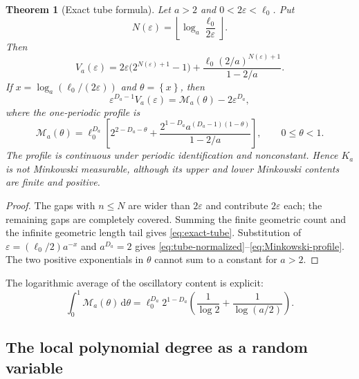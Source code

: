 \documentclass[11pt,oneside]{article}
\newtheorem{theorem}{Theorem}[section]
\theoremstyle{definition}
\theoremstyle{remark}
\newcommand{\dd}{\,\mathrm d}
\newcommand{\eps}{\varepsilon}
\newcommand{\floor}[1]{\left\lfloor #1\right\rfloor}
\newcommand{\fract}[1]{\left\{#1\right\}}
\begin{document}
\begin{theorem}[Exact tube formula]
\label{thm:tube-formula}
Let $a>2$ and $0<2\eps<\ell_0$.  Put
\begin{equation}
 N(\eps)=\floor{\log_a\frac{\ell_0}{2\eps}}.
 \label{eq:N-eps}
\end{equation}
Then
\begin{equation}
 \boxed{\quad
 V_a(\eps)=2\eps\bigl(2^{N(\eps)+1}-1\bigr)
 +\frac{\ell_0(2/a)^{N(\eps)+1}}{1-2/a}.
 \quad}
 \label{eq:exact-tube}
\end{equation}
If $x=\log_a(\ell_0/(2\eps))$ and $\theta=\fract{x}$, then
\begin{equation}
 \eps^{D_a-1}V_a(\eps)=\mathcal M_a(\theta)-2\eps^{D_a},
 \label{eq:tube-normalized}
\end{equation}
where the one-periodic profile is
\begin{equation}
 \mathcal M_a(\theta)=\ell_0^{D_a}
 \left[
 2^{2-D_a-\theta}
 +\frac{2^{1-D_a}a^{(D_a-1)(1-\theta)}}{1-2/a}
 \right],\qquad0\le\theta<1.
 \label{eq:Minkowski-profile}
\end{equation}
The profile is continuous under periodic identification and nonconstant.  Hence $K_a$ is not
Minkowski measurable, although its upper and lower Minkowski contents are finite and positive.
\end{theorem}

\begin{proof}
The gaps with $n\le N$ are wider than $2\eps$ and contribute $2\eps$ each; the remaining
gaps are completely covered.  Summing the finite geometric count and the infinite geometric
length tail gives \eqref{eq:exact-tube}.  Substitution of
$\eps=(\ell_0/2)a^{-x}$ and $a^{D_a}=2$ gives
\eqref{eq:tube-normalized}--\eqref{eq:Minkowski-profile}.  The two positive exponentials in
$\theta$ cannot sum to a constant for $a>2$.
\end{proof}

The logarithmic average of the oscillatory content is explicit:
\begin{equation}
 \int_0^1\mathcal M_a(\theta)\dd\theta
 =\ell_0^{D_a}2^{1-D_a}
 \left(\frac1{\log2}+\frac1{\log(a/2)}\right).
 \label{eq:average-Minkowski}
\end{equation}

\subsection{The local polynomial degree as a random variable}
\end{document}
